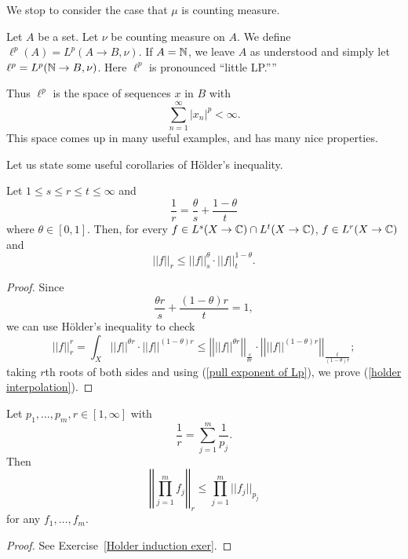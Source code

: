 We stop to consider the case that $\mu$ is counting measure.

\begin{definition}
Let $A$ be a set. Let $\nu$ be counting measure on $A$. We define $\ell^p(A) = L^p(A \to B, \nu)$.
If $A = \mathbb{N}$, we leave $A$ as understood and simply let $\ell^{p} = L^p(\mathbb{N} \to B, \nu)$.
Here $\ell^p$ is pronounced ``little LP.''''
\end{definition}

Thus $\ell^p$ is the space of sequences $x$ in $B$ with
\[\sum_{n = 1}^{\infty} |x_{n}|^{p} < \infty.\]
This space comes up in many useful examples, and has many nice properties.

Let us state some useful corollaries of H\"older's inequality.
\begin{corollary}
Let $1 \leq s \leq r \leq t \leq \infty$ and
\[\frac{1}{r} = \frac{\theta}{s} + \frac{1 - \theta}{t}\]
where $\theta \in [0, 1]$. Then, for every $f \in L^s(X \to \mathbb{C}) \cap L^t(X \to \mathbb{C})$, $f \in L^r(X \to \mathbb{C})$ and
\begin{equation}
\label{holder interpolation}
||f||_{r} \leq ||f||_s^{\theta} \cdot ||f||_t^{1-\theta}.
\end{equation}
\end{corollary}
\begin{proof}
Since
\[\frac{\theta r}{s} + \frac{(1 - \theta)r}{t} = 1,\]
we can use H\"older's inequality to check
\[||f||_r^{r} = \int_{X} ||f||^{\theta r} \cdot ||f||^{(1 - \theta)r} \leq \left|\left|||f||^{\theta r}\right|\right|_{\frac{s}{\theta r}} \cdot \left|\left|||f||^{(1 - \theta) r}\right|\right|_{\frac{t}{(1 - \theta)r}};\]
taking $r$th roots of both sides and using (\ref{pull exponent of Lp}), we prove (\ref{holder interpolation}).
\end{proof}

\begin{corollary}
\label{Holder induction}
Let $p_1, \dots, p_{m}, r \in [1, \infty]$ with
\[\frac{1}{r} = \sum_{j=1}^{m} \frac{1}{p_{j}}.\]
Then
\[\left|\left|\prod_{j=1}^{m} f_{j}\right|\right|_{r} \leq \prod_{j=1}^{m} ||f_{j}||_{p_{j}}\]
for any $f_1, \dots, f_{m}$.
\end{corollary}
\begin{proof}
See Exercise~\ref{Holder induction exer}.
\end{proof}

